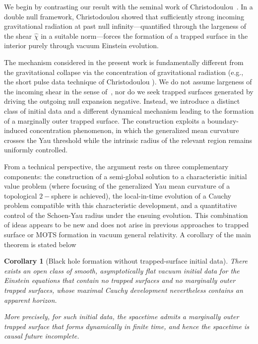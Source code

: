 \documentclass{amsart}
\newtheorem{corollary}{Corollary}[section]
\begin{document}
\noindent We begin by contrasting our result with the seminal work of Christodoulou~\cite{christodoulou}.  
In a double null framework, Christodoulou showed that sufficiently strong incoming gravitational radiation at past null infinity—quantified through the largeness of the shear $\hat\chi$ in a suitable norm—forces the formation of a trapped surface in the interior purely through vacuum Einstein evolution.

\noindent The mechanism considered in the present work is fundamentally different from the gravitational collapse via the concentration of gravitational radiation (e.g., the short pulse data technique of Christodoulou \cite{christodoulou}). We do not assume largeness of the incoming shear in the sense of~\cite{christodoulou}, nor do we seek trapped surfaces generated by driving the outgoing null expansion negative. Instead, we introduce a distinct class of initial data and a different dynamical mechanism leading to the formation of a marginally outer trapped surface. The construction exploits a boundary-induced concentration phenomenon, in which the generalized mean curvature crosses the Yau threshold while the intrinsic radius of the relevant region remains uniformly controlled.

\noindent From a technical perspective, the argument rests on three complementary components: the construction of a semi-global solution to a characteristic initial value problem (where focusing of the generalized Yau mean curvature of a topological $2-$sphere is achieved), the local-in-time evolution of a Cauchy problem compatible with this characteristic development, and a quantitative control of the Schoen-Yau radius under the ensuing evolution. This combination of ideas appears to be new and does not arise in previous approaches to trapped surface or MOTS formation in vacuum general relativity. A corollary of the main theorem is stated below


\begin{corollary}[Black hole formation without trapped-surface initial data]
\label{cor:blackhole}
There exists an open class of smooth, asymptotically flat vacuum initial data for the Einstein equations that contain no trapped surfaces and no marginally outer trapped surfaces, whose maximal Cauchy development nevertheless contains an apparent horizon.

\noindent More precisely, for such initial data, the spacetime admits a marginally outer trapped surface that forms dynamically in finite time, and hence the spacetime is causal future incomplete.
\end{corollary}
\end{document}
